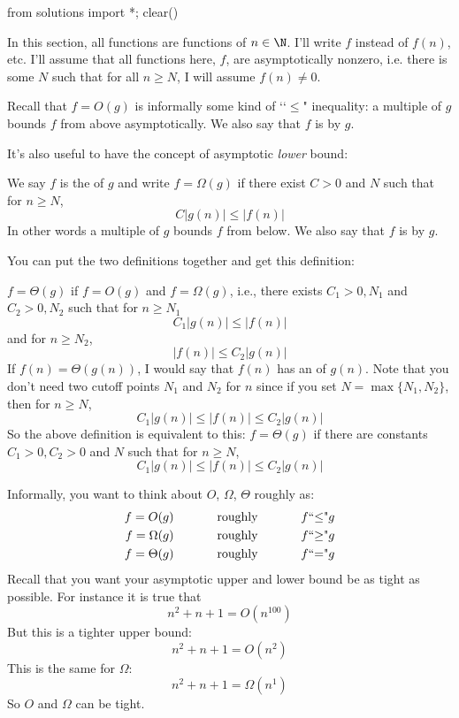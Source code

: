 \begin{python0}
from solutions import *; clear()
\end{python0}

In this section, all functions are functions of $n \in \N$.
I'll write $f$ instead of $f(n)$, etc.
I'll assume that all functions here, $f$, are asymptotically nonzero, i.e.
there is some $N$ such that for all $n \geq N$, I will assume $f(n) \neq 0$.

Recall that $f = O(g)$ is
informally some kind of \lq\lq $\leq$" inequality:
a multiple of $g$ bounds $f$ from above asymptotically.
We also say that $f$ is  by $g$.

It's also useful to have the concept of asymptotic \textit{lower} bound:

\begin{defn}
  We
  say $f$ is the  of $g$ and 
  write $f = \Omega(g)$ if
  there exist $C > 0$ and $N$ such that 
  for $n \geq N$,
  \[
  C|g(n)| \leq |f(n)|
  \]
  In other words a multiple of $g$ bounds $f$ from below.
  We also say that $f$ is  by $g$.
\end{defn}

You can put the two definitions together and get this definition:

\begin{defn}
$f = \Theta(g)$ if $f = O(g)$ and $f = \Omega(g)$, i.e., 
there exists $C_1 > 0, N_1$ and $C_2 > 0, N_2$ such that
for $n \geq N_1$
\[
C_1|g(n)| \leq |f(n)|
\]
and for $n \geq N_2$,
\[
|f(n)| \leq C_2 |g(n)|
\]
If $f(n) = \Theta(g(n))$, I would say that
$f(n)$ has an  of $g(n)$.
Note that you don't need two cutoff points $N_1$ and $N_2$ for $n$
since if you
set $N = \max \{ N_1, N_2 \}$, then for $n \geq N$,
\[
C_1|g(n)| \leq |f(n)| \leq C_2 |g(n)|
\]
So the above definition is equivalent to this:
$f = \Theta(g)$ if there are constants $C_1 > 0, C_2 > 0$ and $N$ such that
for $n \geq N$,
\[
C_1|g(n)| \leq |f(n)| \leq C_2 |g(n)|
\]
\end{defn}

Informally, you want to think about $O$, $\Omega$, $\Theta$ roughly as:
\begin{align*}
f = O(g)      &\text{ \hspace{1cm} roughly \hspace{1cm} } f \text{\lq\lq$\leq$"} g \\
f = \Omega(g) &\text{ \hspace{1cm} roughly \hspace{1cm} } f \text{\lq\lq$\geq$"} g \\
f = \Theta(g) &\text{ \hspace{1cm} roughly \hspace{1cm} } f \text{\lq\lq$=$"} g
\end{align*}
Recall that you want your asymptotic upper and lower bound be as tight as
possible.
For instance it is true that
\[
n^2 + n + 1 = O(n^{100})
\]
But this is a tighter upper bound:
\[
n^2 + n + 1 = O(n^{2})
\]
This is the same for $\Omega$:
\[
n^2 + n + 1 = \Omega(n^1)
\]
So $O$ and $\Omega$ can be tight.


